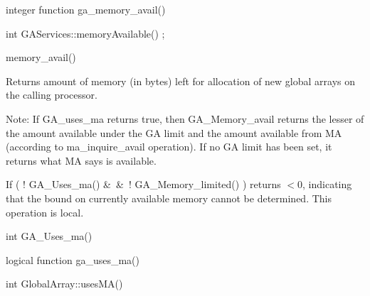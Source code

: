 \documentclass[12pt]{article}
\begin{document}
\begin{fapi}
\begin{fcode}
integer function ga_memory_avail()
\end{fcode}
\end{fapi}

\begin{cxxapi}
\begin{cxxcode}
int GAServices::memoryAvailable() ;
\end{cxxcode}
\end{cxxapi}

\begin{pyapi}
\begin{pycode}
memory_avail() 
\end{pycode}
\end{pyapi}

\local

\begin{desc}

Returns amount of memory (in bytes) left for allocation of new global
arrays on the calling processor.

Note: If GA_uses_ma returns true, then GA_Memory_avail returns the lesser 
of the amount available under the GA limit and the amount available from MA 
(according to ma_inquire_avail operation). If no GA limit has been set, it 
returns what MA says is available.

If ( ! GA_Uses_ma() \&\ \&\ ! GA_Memory_limited() ) returns $< 0$, indicating 
that the bound on currently available memory cannot be determined.
This operation is local.
\end{desc}


\begin{capi}
\begin{ccode}
int GA_Uses_ma()
\end{ccode}
\end{capi}

\begin{fapi}
\begin{fcode}
logical function ga_uses_ma()
\end{fcode}
\end{fapi}

\begin{cxxapi}
\begin{cxxcode}
int GlobalArray::usesMA()
\end{cxxcode}
\end{cxxapi}
\end{document}
